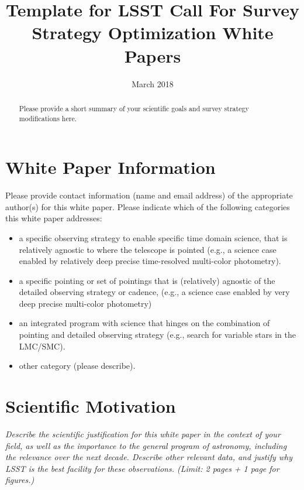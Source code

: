 \documentclass[11pt]{article}
\title{Template for LSST Call For Survey Strategy Optimization White Papers}
\author{}
\date{March 2018}
\begin{document}
\maketitle

\begin{abstract}
Please provide a short summary of your scientific goals and survey strategy modifications here.
\end{abstract}

\section{White Paper Information}
Please provide contact information (name and email address) of the appropriate author(s) for this white paper.
Please indicate which of the following categories this white paper addresses:
\begin{itemize} 
\item a specific observing strategy to enable specific time domain science, 
	that is relatively agnostic to where the telescope is pointed (e.g., a science case enabled 
	by relatively deep precise time-resolved multi-color photometry). 
\item a specific pointing or set of pointings that is (relatively) agnostic of the detailed observing 
	strategy or cadence, (e.g., a science case enabled by very deep precise multi-color 
	photometry)
\item an integrated program with science that hinges on the combination of pointing and detailed 
	observing strategy (e.g., search for variable stars in the 
	LMC/SMC). 
\item other category (please describe).
\end{itemize}  


\clearpage

\section{Scientific Motivation}

\begin{footnotesize}
{\it Describe the scientific justification for this white paper in the context
of your field, as well as the importance to the general program of astronomy, 
including the relevance over the next decade. 
Describe other relevant data, and justify why LSST is the best facility for these observations.
(Limit: 2 pages + 1 page for figures.)}
\end{footnotesize}

\vspace{.6in}
\end{document}
